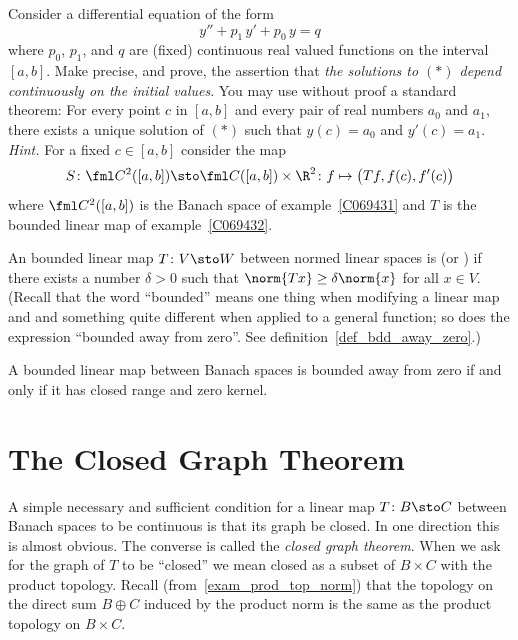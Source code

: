 \begin{exer} Consider a differential equation of the form
   \[ y'' + p_1\,y' + p_0\,y = q  \tag{$\ast$} \]
where $p_0$, $p_1$, and $q$ are (fixed) continuous real valued functions on the interval
$[a,b]$.  Make precise, and prove, the assertion that \emph{the solutions to $(\ast)$
depend continuously on the initial values}.  You may use without proof a standard
theorem: For every point $c$ in $[a,b]$ and every pair of real numbers $a_0$ and $a_1$,
there exists a unique solution of $(\ast)$ such that $y(c) = a_0$ and $y'(c) = a_1$.
\emph{Hint.} For a fixed $c \in [a,b]$ consider the map
  \[ S\colon \fml C^2([a,b]) \sto \fml C([a,b]) \times \R^2 \colon
                                        f \mapsto \bigl(Tf,f(c),f'(c)\bigr) \]
where $\fml C^2([a,b])$ is the Banach space of example~\ref{C069431} and $T$ is the
bounded linear map of example~\ref{C069432}.
\end{exer}

\begin{defn} An bounded linear map  $T\colon V \sto W$ between normed linear spaces  is
 (or
) if there exists a number $\delta > 0$ such that $\norm{Tx} \ge
\delta\norm{x}$ for all $x \in V$. (Recall that the word ``bounded'' means one thing when
modifying a linear map and and something quite different when applied to a general
function; so does the expression ``bounded away from zero''. See
definition~\ref{def_bdd_away_zero}.)
\end{defn}

\begin{prop} A bounded linear map between Banach spaces is bounded away from zero if and
only if it has closed range and zero kernel.
\end{prop}




















\section{The Closed Graph Theorem}
A simple necessary and sufficient condition for a linear map $T\colon B \sto C$ between Banach spaces
to be continuous is that its graph be closed.  In one direction this is almost obvious.  The converse is
called the \emph{closed graph theorem}.  When we ask for the graph of $T$ to be
``closed'' we mean closed as a subset of $B \times C$ with the product topology.  Recall (from~\ref{exam_prod_top_norm})
that the topology on the direct sum $B \oplus C$ induced by the product norm is the same as the product topology on $B \times C$.

